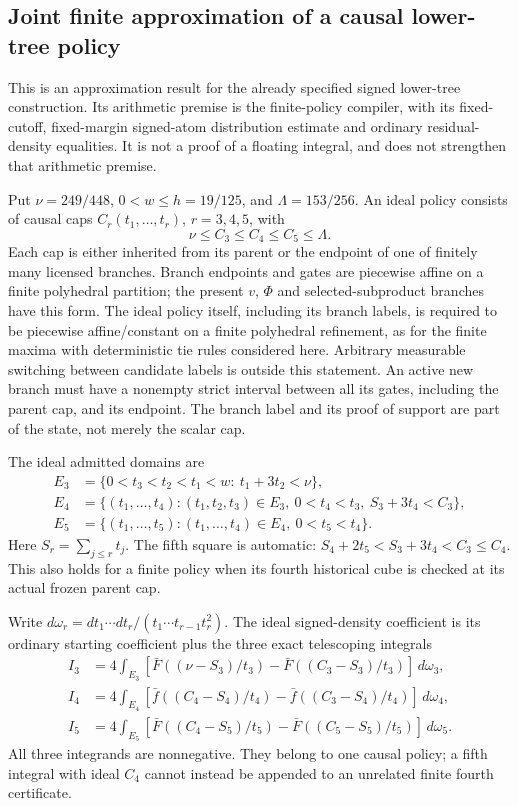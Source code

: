 \subsection{Joint finite approximation of a causal lower-tree policy}
\label{sec:lower-start-joint-finite-approximation}

This is an approximation result for the already specified signed
lower-tree construction. Its arithmetic premise is the finite-policy
compiler, with its fixed-cutoff, fixed-margin signed-atom distribution
estimate and ordinary residual-density equalities. It is not a proof
of a floating integral, and does not strengthen that arithmetic premise.

Put $\nu=249/448$, $0<w\le h=19/125$, and $\Lambda=153/256$.
An ideal policy consists of causal caps
$C_r(t_1,\ldots,t_r)$, $r=3,4,5$, with
\[
 \nu\le C_3\le C_4\le C_5\le\Lambda.
\]
Each cap is either inherited from its parent or the endpoint of one
of finitely many licensed branches. Branch endpoints and gates are
piecewise affine on a finite polyhedral partition; the present
$v$, $\Phi$ and selected-subproduct branches have this form.
The ideal policy itself, including its branch labels, is required
to be piecewise affine/constant on a finite polyhedral refinement,
as for the finite maxima with deterministic tie rules considered
here. Arbitrary measurable switching between candidate labels is
outside this statement.
An active new branch must have a nonempty strict interval between
all its gates, including the parent cap, and its endpoint.
The branch label and its proof of support are part of the state,
not merely the scalar cap.

The ideal admitted domains are
\begin{align*}
 E_3&=\{0<t_3<t_2<t_1<w:\ t_1+3t_2<\nu\},\\
 E_4&=\{(t_1,\ldots,t_4):(t_1,t_2,t_3)\in E_3,
       \ 0<t_4<t_3,\ S_3+3t_4<C_3\},\\
 E_5&=\{(t_1,\ldots,t_5):(t_1,\ldots,t_4)\in E_4,
                                      \ 0<t_5<t_4\}.
\end{align*}
Here $S_r=\sum_{j\le r}t_j$. The fifth square is automatic:
$S_4+2t_5<S_3+3t_4<C_3\le C_4$. This also holds for a finite
policy when its fourth historical cube is checked at its actual
frozen parent cap.

Write $d\omega_r=dt_1\cdots dt_r/(t_1\cdots t_{r-1}t_r^2)$.
The ideal signed-density coefficient is its ordinary starting
coefficient plus the three exact telescoping integrals
\begin{align*}
 I_3&=4\int_{E_3}
  [\bar F((\nu-S_3)/t_3)-\bar F((C_3-S_3)/t_3)]\,d\omega_3,\\
 I_4&=4\int_{E_4}
  [\bar f((C_4-S_4)/t_4)-\bar f((C_3-S_4)/t_4)]\,d\omega_4,\\
 I_5&=4\int_{E_5}
  [\bar F((C_4-S_5)/t_5)-\bar F((C_5-S_5)/t_5)]\,d\omega_5.
\end{align*}
All three integrands are nonnegative. They belong to one causal
policy; a fifth integral with ideal $C_4$ cannot instead be appended
to an unrelated finite fourth certificate.

